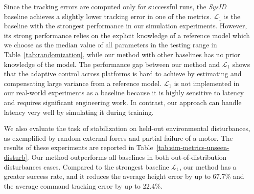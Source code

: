 %
Since the tracking errors are computed only for successful runs, the \emph{SysID} baseline achieves a slightly lower tracking error in one of the metrics.
%
$\mathcal{L}_1$ is the baseline with the strongest performance in our simulation experiments. However, its strong performance relies on the explicit knowledge of a reference model which we choose as the median value of all parameters in the testing range in Table~\ref{tab:randomization}, while our method with other baselines has no prior knowledge of the model. 
%
The performance gap between our method and $\mathcal{L}_1$ shows that the adaptive control across platforms is hard to achieve by estimating and compensating large variance from a reference model. 
%
$\mathcal{L}_1$ is not implemented in our real-world experiments as a baseline because it is highly sensitive to latency and requires significant engineering work. In contrast, our approach can handle latency very well by simulating it during training.
%

We also evaluate the task of stabilization on held-out environmental disturbances, as exemplified by random external forces and partial failure of a motor. The results of these experiments are reported in Table~\ref{tab:sim-metrics-unseen-disturb}. Our method outperforms all baselines in both out-of-distribution disturbances cases. Compared to the strongest baseline $\mathcal{L}_1$, our method has a greater success rate, and it reduces the average height error by up to 67.7\% and the average command tracking error by up to 22.4\%. 


